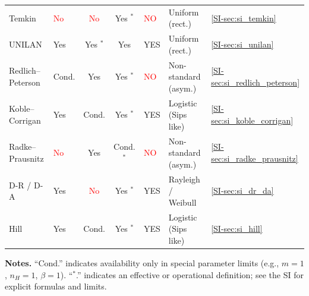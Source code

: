 \documentclass[journal=jacsat,manuscript=article]{achemso}
\begin{document}
\begin{table}[H]
\begin{tabular}{@{} p{2.0cm} p{1.0cm} c c p{3.0cm} p{3.8cm} p{1.8cm} @{}}
			Temkin
			& \textcolor{red}{No} & \textcolor{red}{No} & \textcolor{green!50!black}{Yes} $^*$
			& \textcolor{red}{NO}
			& Uniform (rect.)
			& \ref{SI-sec:si_temkin} \\
			UNILAN
			& \textcolor{green!50!black}{Yes} & \textcolor{green!50!black}{Yes} $^*$ & \textcolor{green!50!black}{Yes}
			& \textcolor{green!50!black}{YES}
			& Uniform (rect.)
			& \ref{SI-sec:si_unilan} \\
			Redlich--Peterson
			& \textcolor{orange!80!black}{Cond.} & \textcolor{green!50!black}{Yes} & \textcolor{green!50!black}{Yes} $^*$
			& \textcolor{red}{NO}
			& Non-standard (asym.)
			& \ref{SI-sec:si_redlich_peterson} \\
			Koble--Corrigan
			& \textcolor{green!50!black}{Yes} & \textcolor{orange!80!black}{Cond.} & \textcolor{green!50!black}{Yes} $^*$
			& \textcolor{green!50!black}{YES}
			& Logistic (Sips  like)
			& \ref{SI-sec:si_koble_corrigan} \\
			Radke--Prausnitz
			& \textcolor{red}{No} & \textcolor{green!50!black}{Yes} & \textcolor{orange!80!black}{Cond.} $^*$
			& \textcolor{red}{NO}
			& Non-standard (asym.)
			& \ref{SI-sec:si_radke_prausnitz} \\
			D-R / D-A
			& \textcolor{green!50!black}{Yes} & \textcolor{red}{No} & \textcolor{green!50!black}{Yes} $^*$
			& \textcolor{green!50!black}{YES}
			& Rayleigh / Weibull
			& \ref{SI-sec:si_dr_da} \\
			Hill
			& \textcolor{green!50!black}{Yes} & \textcolor{orange!80!black}{Cond.} & \textcolor{green!50!black}{Yes} $^*$
			& \textcolor{green!50!black}{YES}
			& Logistic (Sips like)
			& \ref{SI-sec:si_hill} \\
			\hline
		\end{tabular}
	\end{table}

	\noindent\textbf{Notes.} ``Cond.'' indicates availability only in special parameter limits (e.g., $m=1$, $n_H=1$, $\beta=1$). ``$^*$.'' indicates an effective or operational definition; see the SI for explicit formulas and limits.
	
	
	
\end{document}
